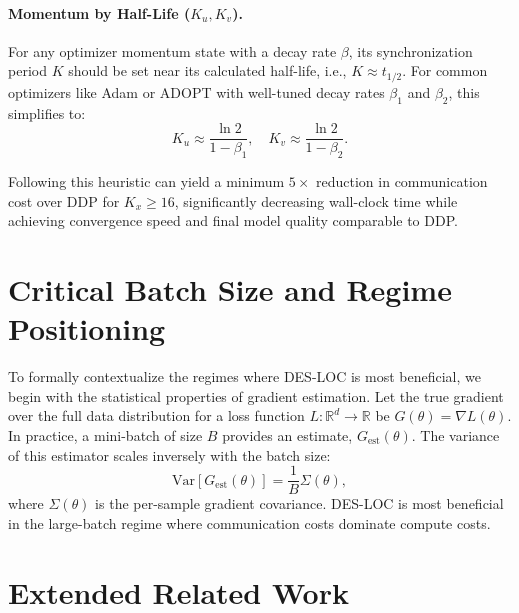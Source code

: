 \paragraph{Momentum by Half-Life ($K_u, K_v$).} For any optimizer momentum state with a decay rate
$\beta$, its synchronization period $K$ should be set near its calculated half-life, i.e., $K \approx t_{1/2}$.
For common optimizers like Adam or ADOPT with well-tuned decay rates $\beta_1$ and $\beta_2$, this
simplifies to:
\begin{equation}
K_u \approx \frac{\ln 2}{1 - \beta_1}, \quad K_v \approx \frac{\ln 2}{1 - \beta_2}.
\end{equation}

Following this heuristic can yield a minimum $5\times$ reduction in communication cost over DDP for
$K_x \geq 16$, significantly decreasing wall-clock time while achieving convergence speed and final
model quality comparable to DDP.

\section{Critical Batch Size and Regime Positioning}
\label{sec:critical_batch}

To formally contextualize the regimes where DES-LOC is most beneficial, we begin with the statistical
properties of gradient estimation. Let the true gradient over the full data distribution for a loss function
$L: \mathbb{R}^d \to \mathbb{R}$ be $G(\theta) = \nabla L(\theta)$. In practice, a mini-batch of size $B$ provides an estimate, $G_{\text{est}}(\theta)$.
The variance of this estimator scales inversely with the batch size:
\begin{equation}
\text{Var}[G_{\text{est}}(\theta)] = \frac{1}{B}\Sigma(\theta),
\end{equation}
where $\Sigma(\theta)$ is the per-sample gradient covariance. DES-LOC is most beneficial in the large-batch regime where communication costs dominate compute costs.

\section{Extended Related Work}
\label{sec:extended_related}

